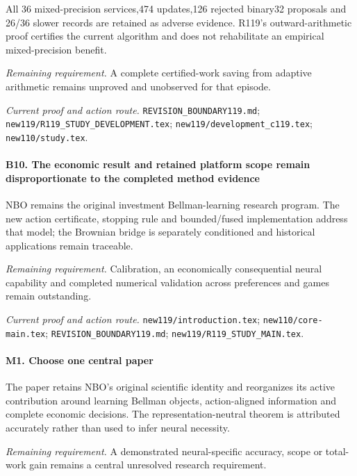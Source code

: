 All 36 mixed-precision services,474 updates,126 rejected binary32 proposals and 26/36 slower records are retained as adverse evidence. R119's outward-arithmetic proof certifies the current algorithm and does not rehabilitate an empirical mixed-precision benefit.

\par\emph{Remaining requirement.} A complete certified-work saving from adaptive arithmetic remains unproved and unobserved for that episode.

\par\emph{Current proof and action route.} \nolinkurl{REVISION_BOUNDARY119.md}; \nolinkurl{new119/R119_STUDY_DEVELOPMENT.tex}; \nolinkurl{new119/development_c119.tex}; \nolinkurl{new110/study.tex}.

\paragraph{B10. The economic result and retained platform scope remain disproportionate to the completed method evidence}

NBO remains the original investment Bellman-learning research program. The new action certificate, stopping rule and bounded/\allowbreak{}fused implementation address that model; the Brownian bridge is separately conditioned and historical applications remain traceable.

\par\emph{Remaining requirement.} Calibration, an economically consequential neural capability and completed numerical validation across preferences and games remain outstanding.

\par\emph{Current proof and action route.} \nolinkurl{new119/introduction.tex}; \nolinkurl{new110/core-main.tex}; \nolinkurl{REVISION_BOUNDARY119.md}; \nolinkurl{new119/R119_STUDY_MAIN.tex}.

\paragraph{M1. Choose one central paper}

The paper retains NBO's original scientific identity and reorganizes its active contribution around learning Bellman objects, action-aligned information and complete economic decisions. The representation-neutral theorem is attributed accurately rather than used to infer neural necessity.

\par\emph{Remaining requirement.} A demonstrated neural-specific accuracy, scope or total-work gain remains a central unresolved research requirement.

